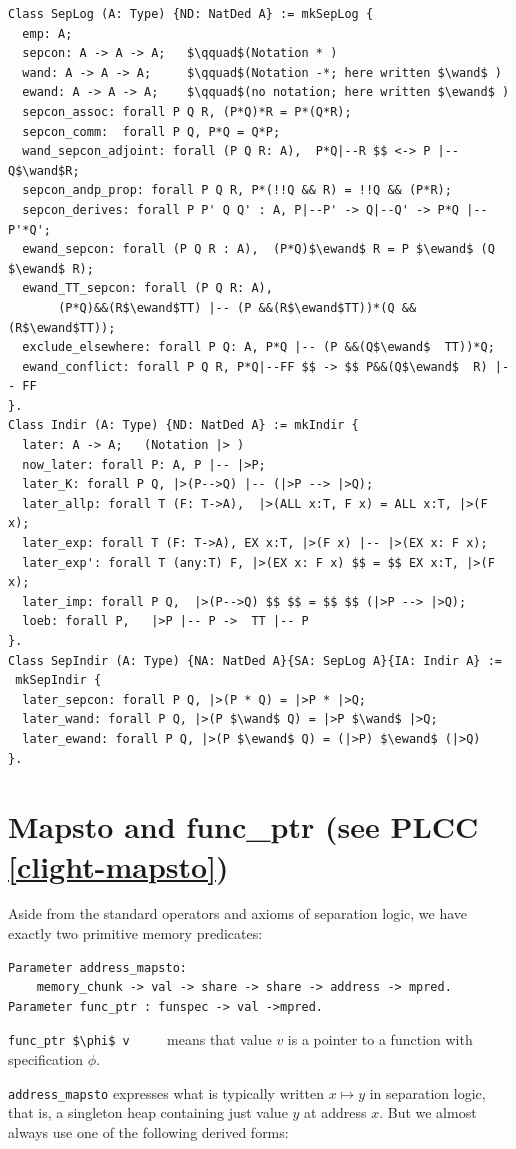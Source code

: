 \documentclass[12pt,fleqn,openany,oneside,showtrims]{memoir}
\newcommand{\ychapter}[2]{\chapter[#1]{#1 \hfill \normalsize #2}}
\begin{document}
\clearpage
\begin{lstlisting}
Class SepLog (A: Type) {ND: NatDed A} := mkSepLog {
  emp: A;
  sepcon: A -> A -> A;   $\qquad$(Notation * )
  wand: A -> A -> A;     $\qquad$(Notation -*; here written $\wand$ )
  ewand: A -> A -> A;    $\qquad$(no notation; here written $\ewand$ )
  sepcon_assoc: forall P Q R, (P*Q)*R = P*(Q*R);
  sepcon_comm:  forall P Q, P*Q = Q*P;
  wand_sepcon_adjoint: forall (P Q R: A),  P*Q|--R $$ <-> P |-- Q$\wand$R;
  sepcon_andp_prop: forall P Q R, P*(!!Q && R) = !!Q && (P*R);
  sepcon_derives: forall P P' Q Q' : A, P|--P' -> Q|--Q' -> P*Q |-- P'*Q';
  ewand_sepcon: forall (P Q R : A),  (P*Q)$\ewand$ R = P $\ewand$ (Q $\ewand$ R);
  ewand_TT_sepcon: forall (P Q R: A),
       (P*Q)&&(R$\ewand$TT) |-- (P &&(R$\ewand$TT))*(Q && (R$\ewand$TT));
  exclude_elsewhere: forall P Q: A, P*Q |-- (P &&(Q$\ewand$  TT))*Q;
  ewand_conflict: forall P Q R, P*Q|--FF $$ -> $$ P&&(Q$\ewand$  R) |-- FF
}.
Class Indir (A: Type) {ND: NatDed A} := mkIndir {
  later: A -> A;   (Notation |> )
  now_later: forall P: A, P |-- |>P;
  later_K: forall P Q, |>(P-->Q) |-- (|>P --> |>Q);
  later_allp: forall T (F: T->A),  |>(ALL x:T, F x) = ALL x:T, |>(F x);
  later_exp: forall T (F: T->A), EX x:T, |>(F x) |-- |>(EX x: F x);
  later_exp': forall T (any:T) F, |>(EX x: F x) $$ = $$ EX x:T, |>(F x);
  later_imp: forall P Q,  |>(P-->Q) $$ $$ = $$ $$ (|>P --> |>Q);
  loeb: forall P,   |>P |-- P ->  TT |-- P
}.
Class SepIndir (A: Type) {NA: NatDed A}{SA: SepLog A}{IA: Indir A} :=
 mkSepIndir {
  later_sepcon: forall P Q, |>(P * Q) = |>P * |>Q;
  later_wand: forall P Q, |>(P $\wand$ Q) = |>P $\wand$ |>Q;
  later_ewand: forall P Q, |>(P $\ewand$ Q) = (|>P) $\ewand$ (|>Q)
}.
\end{lstlisting}
\vspace*{-24pt}
\ychapter{Mapsto and func\_ptr}{(see PLCC \autoref{clight-mapsto})}

Aside from the standard operators and axioms of separation logic,
we have exactly two primitive
memory predicates:

\begin{lstlisting}
Parameter address_mapsto:
    memory_chunk -> val -> share -> share -> address -> mpred.
Parameter func_ptr : funspec -> val ->mpred.
\end{lstlisting}
\lstinline{func_ptr $\phi$ v} $\qquad$ means that value $v$
is a pointer to a function with specification $\phi$.

\lstinline{address_mapsto} expresses what is typically
written $x\mapsto y$ in separation logic,
that is, a singleton heap containing just value $y$ at address $x$.
But we almost always use one of the following derived forms:
\end{document}
